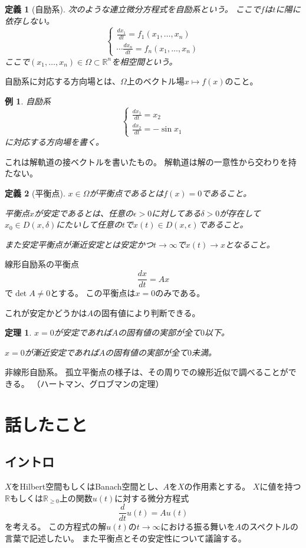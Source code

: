 \documentclass{jsarticle}
\newtheorem{dfn}{定義}
\newtheorem{eg}{例}
\newtheorem{thm}{定理}
\newcommand{\R}{\mathbb{R}}
\begin{document}
\begin{dfn}[自励系]
次のような連立微分方程式を自励系という。
ここで$f$は$t$に陽に依存しない。
\[
\begin{cases}
\frac{dx_1}{dt}=f_1(x_1,\ldots,x_n)\\
\cdots
\frac{dx_n}{dt}=f_n(x_1,\ldots,x_n)
\end{cases}
\]
ここで$(x_1,\ldots,x_n)\in\Omega\subset\R^n$を相空間という。
\end{dfn}

自励系に対応する方向場とは、$\Omega$上のベクトル場$x\mapsto f(x)$のこと。

\begin{eg}
自励系
\[
\begin{cases}
\frac{dx_1}{dt}=x_2\\
\frac{dx_2}{dt}=-\sin x_1
\end{cases}
\]
に対応する方向場を書く。
\end{eg}
これは解軌道の接ベクトルを書いたもの。
解軌道は解の一意性から交わりを持たない。

\begin{dfn}[平衡点]
$x\in\Omega$が平衡点であるとは$f(x)=0$であること。

平衡点$x$が安定であるとは、任意の$\epsilon>0$に対してある$\delta>0$が存在して$x_0\in D(x,\delta)$にたいして任意の$t$で$x(t)\in D(x,\epsilon)$であること。

また安定平衡点が漸近安定とは安定かつ$t\to \infty$で$x(t)\to x$となること。
\end{dfn}

線形自励系の平衡点
\[
\frac{dx}{dt}=Ax
\]
で$\det A\neq0$とする。
この平衡点は$x=0$のみである。

これが安定かどうかは$A$の固有値により判断できる。
\begin{thm}
$x=0$が安定であれば$A$の固有値の実部が全て$0$以下。

$x=0$が漸近安定であれば$A$の固有値の実部が全て$0$未満。
\end{thm}

非線形自励系。
孤立平衡点の様子は、その周りでの線形近似で調べることができる。
（ハートマン、グロブマンの定理）

\section{話したこと}
\subsection{イントロ}
$X$をHilbert空間もしくはBanach空間とし、$A$を$X$の作用素とする。
$X$に値を持つ$\R$もしくは$\R_{\geq0}$上の関数$u(t)$に対する微分方程式
\[
\frac{d}{dt}u(t)=Au(t)
\]
を考える。
この方程式の解$u(t)$の$t\to\infty$における振る舞いを$A$のスペクトルの言葉で記述したい。
また平衡点とその安定性について議論する。
\end{document}
